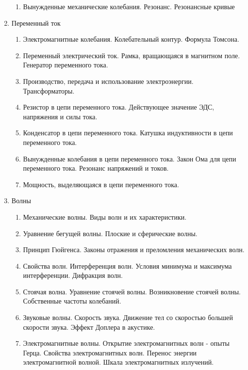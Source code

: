\documentclass{article}
\begin{document}
\begin{enumerate}
\begin{enumerate}
        \item Вынужденные механические колебания. Резонанс. Резонансные кривые
    \end{enumerate}
    \item Переменный ток
    \begin{enumerate}
        \item Электромагнитные колебания. Колебательный контур. Формула Томсона.
        \item Переменный электрический ток. Рамка, вращающаяся в магнитном поле. Генератор переменного тока.
        \item Производство, передача и использование электроэнергии. Трансформаторы.
        \item Резистор в цепи переменного тока. Действующее значение ЭДС, напряжения и силы тока.
        \item Конденсатор в цепи переменного тока. Катушка индуктивности в цепи переменного тока.
        \item Вынужденные колебания в цепи переменного тока. Закон Ома для цепи переменного тока. Резонанс напряжений и токов.
        \item Мощность, выделяющаяся в цепи переменного тока.
    \end{enumerate}
    \item Волны
    \begin{enumerate}
        \item Механические волны. Виды волн и их характеристики.
        \item Уравнение бегущей волны. Плоские и сферические волны. 
        \item Принцип Гюйгенса. Законы отражения и преломления механических волн.
        \item Свойства волн. Интерференция волн. Условия минимума и максимума интерференции.  Дифракция волн. 
        \item Стоячая волна. Уравнение стоячей волны. Возникновение стоячей волны. Собственные частоты колебаний.
        \item Звуковые волны. Скорость звука.  Движение тел со скоростью большей скорости звука. Эффект Доплера в акустике.  
        \item Электромагнитные волны. Открытие электромагнитных волн - опыты Герца. Свойства электромагнитных волн. Перенос энергии электромагнитной волной. Шкала электромагнитных излучений. 
    \end{enumerate}
\end{enumerate}
\end{document}
